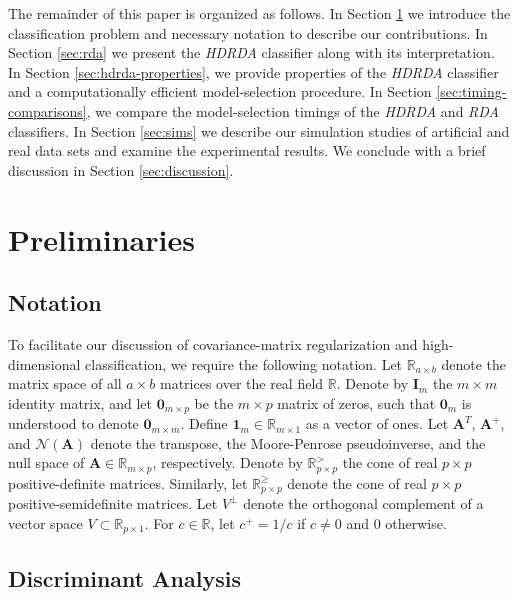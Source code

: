 \documentclass[]{interact}\usepackage[]{graphicx}\usepackage[]{color}
\begin{document}
The remainder of this paper is organized as follows. In Section
\ref{sec:preliminaries} we introduce the classification problem and necessary
notation to describe our contributions. In Section \ref{sec:rda} we present the
\emph{HDRDA} classifier along with its interpretation. In Section
\ref{sec:hdrda-properties}, we provide properties of the \emph{HDRDA} classifier
and a computationally efficient model-selection procedure. In Section
\ref{sec:timing-comparisons}, we compare the model-selection timings of the
\emph{HDRDA} and \emph{RDA} classifiers. In Section \ref{sec:sims} we describe
our simulation studies of artificial and real data sets and examine the
experimental results. We conclude with a brief discussion in Section
\ref{sec:discussion}.

 

\section{Preliminaries}
\label{sec:preliminaries}

\subsection{Notation}

To facilitate our discussion of covariance-matrix regularization and
high-dimensional classification, we require the following notation. Let
$\mathbb{R}_{a \times b}$ denote the matrix space of all $a \times b$ matrices
over the real field $\mathbb{R}$. Denote by $\bm I_m$ the $m \times m$ identity
matrix, and let $\bm 0_{m \times p}$ be the $m \times p$ matrix of zeros, such
that $\bm 0_m$ is understood to denote $\bm 0_{m \times m}$. Define $\bm 1_m \in
\mathbb{R}_{m \times 1}$ as a vector of ones. Let $\bm A^{T}$, $\bm A^+$, and
$\mathcal{N}(\bm A)$ denote the transpose, the Moore-Penrose pseudoinverse, and
the null space of $\bm A \in \mathbb{R}_{m \times p}$, respectively. Denote by
$\mathbb{R}_{p \times p}^{>}$ the cone of real $p \times p$ positive-definite
matrices. Similarly, let $\mathbb{R}_{p \times p}^{\ge}$ denote the cone of real
$p \times p$ positive-semidefinite matrices. Let $V^{\perp}$ denote the
orthogonal complement of a vector space $V \subset \mathbb{R}_{p \times 1}$. For
$c \in \mathbb{R}$, let $c^+ = 1/c$ if $c \ne 0$ and $0$ otherwise.

\subsection{Discriminant Analysis}
\end{document}
